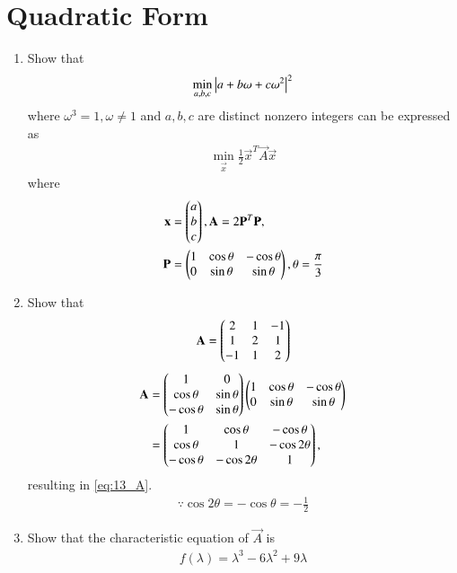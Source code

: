\documentclass[journal,12pt,twocolumn]{IEEEtran}
\renewcommand\thesection{\arabic{section}}
\begin{document}
\section{Quadratic Form}
\begin{enumerate}[label=\thesection.\arabic*
,ref=\thesection.\theenumi]
\item Show that 
\begin{align}
\min_{a,b,c} \left\vert a + b\omega + c\omega^2\right\vert^2
\end{align}
%
where $\omega^3 = 1, \omega \ne 1$ and $a,b,c$ are distinct nonzero integers
can be expressed as
\begin{align}
\label{eq:13_opt}
\min_{\vec{x}} \frac{1}{2}\vec{x}^T\vec{A}\vec{x}
\end{align}
%
where 
\begin{align}
\mathbf{x}&= \begin{pmatrix}a \\ b \\c\end{pmatrix}, 
\mathbf{A}= 2\mathbf{P}^T\mathbf{P},
\\
\mathbf{P}&= \begin{pmatrix}1 & \cos \theta & -\cos \theta \\ 0 & \sin \theta & \sin \theta\end{pmatrix},
\theta = \frac{\pi}{3} 
\end{align}
\item Show that 
\begin{align}
\label{eq:13_A}
\mathbf{A}  = \begin{pmatrix}
2 & 1 & -1 \\ 
1 & 2 & 1
\\
-1 & 1 & 2
\end{pmatrix}
\end{align}
%
\solution 
\begin{align}
\mathbf{A}&= \begin{pmatrix}1 &  0 \\ \cos \theta & \sin \theta  \\ -\cos \theta  & \sin \theta\end{pmatrix} 
\begin{pmatrix}1 & \cos \theta & -\cos \theta \\ 0 & \sin \theta & \sin \theta\end{pmatrix} 
\nonumber \\
&=\begin{pmatrix}
1 & \cos \theta & -\cos \theta \\ 
\cos \theta & 1 & -\cos 2\theta
\\
-\cos \theta & -\cos 2\theta & 1
\end{pmatrix},
\end{align}
resulting in \eqref{eq:13_A}.
\begin{align}
\because \cos 2 \theta = -\cos \theta = -\frac{1}{2}
\end{align}
\item Show that the characteristic equation of $\vec{A}$ is 
\begin{align}
f(\lambda) = \lambda^3 -6\lambda^2 + 9\lambda
\end{align}

\end{enumerate}
\end{document}
